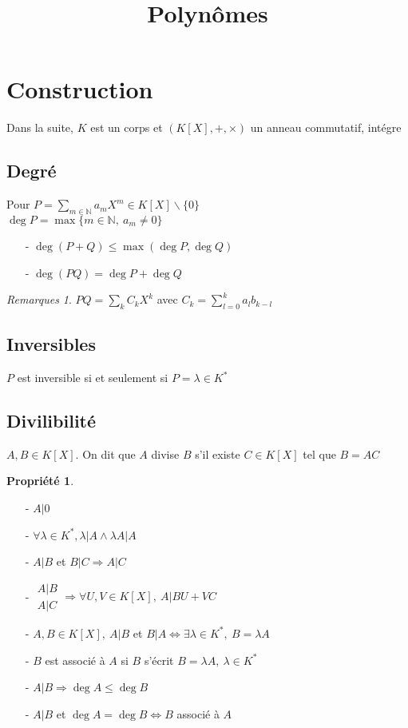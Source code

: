 \documentclass[fleqn]{article}
\title{Polyn\^omes}
\date{}
\theoremstyle{definition} \newtheorem*{defi}{D\'efinition}
\theoremstyle{definition} \newtheorem*{theo}{Th\'eor\`eme}
\theoremstyle{definition} \newtheorem*{coro}{Corollaire}
\theoremstyle{definition} \newtheorem*{nota}{Notation}
\theoremstyle{remark} \newtheorem*{rqs}{Remarques}
\theoremstyle{definition} \newtheorem*{prop}{Propri\'et\'e}
\begin{document}
\maketitle

\section{Construction}
Dans la suite, $K$ est un corps et $(K[X], + , \times)$ un anneau commutatif, int\'egre
\subsection{Degr\'e}
Pour $P =  \sum_{m \in \mathbb{N}} a_m X^m \in K[X]\backslash \{0\}$ \\
$\deg P = \max \{m \in \mathbb{N},\ a_m \neq 0\}$

\begin{itemize}
	\item [-] $\deg (P+Q) \leq \max (\deg P, \deg Q)$
	\item [-] $\deg (PQ) = \deg P + \deg Q$
\end{itemize}

\begin{rqs}
	$PQ = \sum_k C_k X^k$ avec $C_k = \sum_{l=0}^k a_l b_{k-l}$
\end{rqs}

\subsection{Inversibles}
$P$ est inversible si et seulement si $P = \lambda \in K^*$

\subsection{Divilibilit\'e}
$A, B \in K[X]$. On dit que $A$ divise $B$ s'il existe $C \in K[X]$ tel que $B = AC$

\begin{prop} $ $
	\begin{itemize}
		\item [-] $A | 0$
		\item [-] $\forall \lambda \in K^*, \lambda | A \land \lambda A | A$
		\item [-] $A | B$ et $B|C \Rightarrow A | C$
		\item [-]
			$\left. \begin{array}{l}
				A | B \\
				A | C
			\end{array}\right. \Rightarrow \forall U, V \in K[X],\ A |  BU + VC$
		\item [-] $A,B \in K[X],\ A|B$ et $B|A \Leftrightarrow \exists \lambda \in K^*,\ B = \lambda A$
		\item [-] $B$ est associ\'e \`a $A$ si $B$ s'\'ecrit $B = \lambda A,\ \lambda \in K^*$
		\item [-] $A | B \Rightarrow \deg A \leq \deg B$
		\item [-] $A|B$ et $\deg A = \deg B \Leftrightarrow B$ associ\'e \`a $A$
	\end{itemize}
\end{prop}
\end{document}
